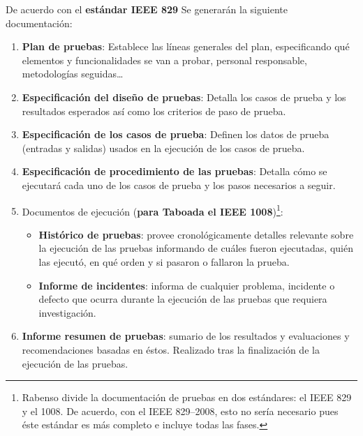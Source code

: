 De acuerdo con el \textbf{estándar IEEE 829} Se generarán la siguiente documentación:
\begin{enumerate}
    \item \textbf{Plan de pruebas}: Establece las líneas generales del plan, especificando qué elementos y funcionalidades se van a probar, personal responsable, metodologías seguidas\ldots
    \item \textbf{Especificación del diseño de pruebas}: Detalla los casos de prueba y los resultados esperados así como los criterios de paso de prueba. %

    \item \textbf{Especificación de los casos de prueba}: Definen los datos de prueba (entradas y salidas) usados en la ejecución de los casos de prueba. %


    \item \textbf{Especificación de procedimiento de las pruebas}: Detalla cómo se ejecutará cada uno de los casos de prueba y los pasos necesarios a seguir.

    \item Documentos de ejecución (\textbf{para Taboada el IEEE 1008})\footnote{Rabenso divide la documentación de pruebas en dos estándares: el IEEE 829 y el 1008. De acuerdo, con el IEEE 829--2008, esto no sería necesario pues éste estándar es más completo e incluye todas las fases.}:
          \begin{itemize}
              \item \textbf{Histórico de pruebas}: provee cronológicamente detalles relevante sobre la ejecución de las pruebas informando de cuáles fueron ejecutadas, quién las ejecutó, en qué orden y si pasaron o fallaron la prueba.
              \item \textbf{Informe de incidentes}: informa de cualquier problema, incidente o defecto que ocurra durante la ejecución de las pruebas que requiera investigación.
          \end{itemize}
    \item \textbf{Informe resumen de pruebas}: sumario de los resultados y evaluaciones y recomendaciones basadas en éstos. Realizado tras la finalización de la ejecución de las pruebas.
\end{enumerate}
